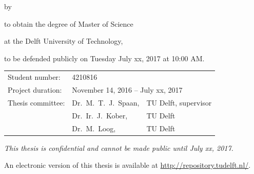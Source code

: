 \begin{titlepage}


\begin{center}


{\makeatletter
\largetitlestyle\fontsize{36}{94}\selectfont\@title										%
\makeatother}

{\makeatletter
\ifx\@subtitle\undefined\else
    \bigskip
   {\tudsffamily\fontsize{22}{32}\selectfont\@subtitle}    
\fi
\makeatother}

\bigskip
\bigskip

by

\bigskip
\bigskip

{\makeatletter
\largetitlestyle\fontsize{20}{26}\selectfont\@author
\makeatother}

\bigskip
\bigskip

to obtain the degree of Master of Science

at the Delft University of Technology,

to be defended publicly on Tuesday July xx, 2017 at 10:00 AM.

\vfill

\begin{tabular}{lll}
    Student number: & 4210816 \\
    Project duration: & \multicolumn{2}{l}{November 14, 2016 -- July xx, 2017} \\
    Thesis committee: & Dr.\ M.\ T.\ J.\ Spaan, & TU Delft, supervisor \\
        & Dr.\ Ir.\ J.\ Kober, & TU Delft \\												%
        & Dr.\ M.\ Loog, & TU Delft 											%
\end{tabular}

\bigskip
\bigskip
\emph{This thesis is confidential and cannot be made public until July xx, 2017.}

\bigskip
\bigskip
An electronic version of this thesis is available at \url{http://repository.tudelft.nl/}.


\end{center}
\end{titlepage}
